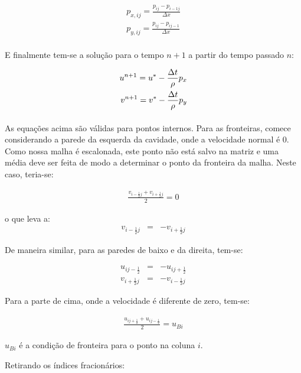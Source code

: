 \documentclass[poisson.tex]{subfiles}
\begin{document}
\begin{eqnarray}
p_{x,ij}=\frac{p_{ij}-p_{i-1j}}{\Delta x}\\
p_{y,ij}=\frac{p_{ij}-p_{ij-1}}{\Delta x}
\end{eqnarray}

\paragraph{} E finalmente tem-se a solução para o tempo $n+1$ a partir do tempo passado $n$:

\begin{eqnarray}
{u}^{n+1}={u}^*-\frac{\Delta t}{\rho}p_{x}\\
{v}^{n+1}={v}^*-\frac{\Delta t}{\rho}p_{y}
\end{eqnarray}
\paragraph{} As equações acima são válidas para pontos internos. Para as fronteiras, comece considerando a parede da esquerda da cavidade, onde a velocidade normal é 0. Como nossa malha é escalonada, este ponto não está salvo na matriz e uma média deve ser feita de modo a determinar o ponto da fronteira da malha. Neste caso, teria-se:

\begin{eqnarray*}
\frac{v_{i-\frac{1}{2}j}+v_{i+\frac{1}{2}j}}{2}=0
\end{eqnarray*}

o que leva a:
\begin{eqnarray}
v_{i-\frac{1}{2}j} &=& -v_{i+\frac{1}{2}j}
\end{eqnarray}

De maneira similar, para as paredes de baixo e da direita, tem-se:

\begin{eqnarray}
u_{ij-\frac{1}{2}}&=&-u_{ij+\frac{1}{2}}\\
v_{i+\frac{1}{2}j} &=& -v_{i-\frac{1}{2}j}
\end{eqnarray}

Para a parte de cima, onde a velocidade é diferente de zero, tem-se:

\begin{eqnarray*}
\frac{u_{ij+\frac{1}{2}}+u_{ij-\frac{1}{2}}}{2}=u_{Bi}
\end{eqnarray*}

$u_{Bi}$ é a condição de fronteira para o ponto na coluna $i$.


Retirando os índices fracionários:
\end{document}
